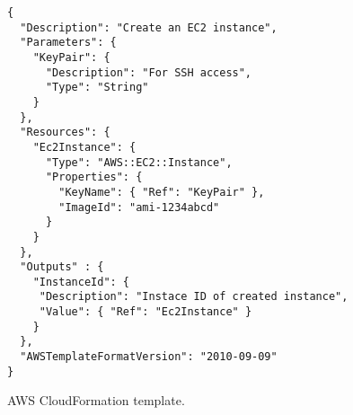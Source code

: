 \begin{figure}[tb]
  \begin{center}
    \begin{verbatim}
{
  "Description": "Create an EC2 instance",
  "Parameters": {
    "KeyPair": {
      "Description": "For SSH access",
      "Type": "String"
    }
  },
  "Resources": {
    "Ec2Instance": {
      "Type": "AWS::EC2::Instance",
      "Properties": {
        "KeyName": { "Ref": "KeyPair" },
        "ImageId": "ami-1234abcd" 
      }
    }
  },
  "Outputs" : {
    "InstanceId": {
     "Description": "Instace ID of created instance",
     "Value": { "Ref": "Ec2Instance" }
    }
  },
  "AWSTemplateFormatVersion": "2010-09-09"
}
    \end{verbatim}
  \end{center}
  \caption{AWS CloudFormation template.}
  \label{fig:cloudformation-template}
\end{figure}

